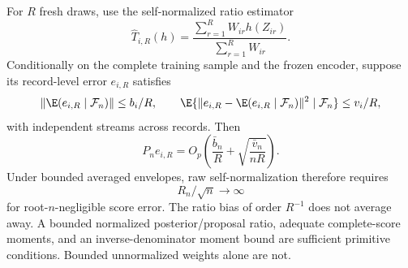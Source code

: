 For $R$ fresh draws, use the self-normalized ratio estimator
\[
 \widehat T_{i,R}(h)
 =\frac{\sum_{r=1}^R W_{ir}h(Z_{ir})}{\sum_{r=1}^R W_{ir}}.
\]
Conditionally on the complete training sample and the frozen encoder, suppose
its record-level error $e_{i,R}$ satisfies
\[
 \|\E(e_{i,R}\mid\mathcal F_n)\|\leq b_i/R,
 \qquad
 \E\{\|e_{i,R}-\E(e_{i,R}\mid\mathcal F_n)\|^2\mid\mathcal F_n\}
 \leq v_i/R,
\]
with independent streams across records.  Then
\begin{equation}
 P_ne_{i,R}
 =O_p\!\left(\frac{\bar b_n}{R}
       +\sqrt{\frac{\bar v_n}{nR}}\right).
 \label{eq:snis_average_rate}
\end{equation}
Under bounded averaged envelopes, raw self-normalization therefore requires
\begin{equation}
 R_n/\sqrt n\longrightarrow\infty
 \label{eq:raw_snis_rate}
\end{equation}
for root-$n$-negligible score error.  The ratio bias of order $R^{-1}$ does not
average away.  A bounded normalized posterior/proposal ratio, adequate
complete-score moments, and an inverse-denominator moment bound are sufficient
primitive conditions.  Bounded unnormalized weights alone are not.

